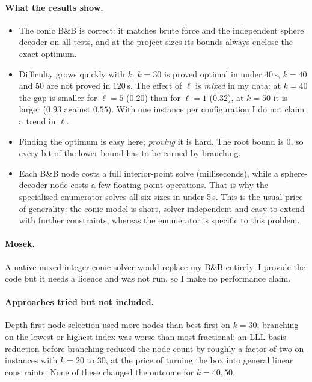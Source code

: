 \documentclass[11pt,a4paper]{article}
\newcommand{\BB}{B\&B}
\begin{document}
\paragraph{What the results show.}
\begin{itemize}
  \item The conic \BB{} is correct: it matches brute force and the independent sphere decoder on all tests, and at the project sizes its bounds always enclose the exact optimum.
  \item Difficulty grows quickly with $k$: $k=30$ is proved optimal in under 40\,s, $k=40$ and $50$ are not proved in 120\,s. The effect of $\ell$ is \emph{mixed} in my data: at $k=40$ the gap is smaller for $\ell=5$ ($0.20$) than for $\ell=1$ ($0.32$), at $k=50$ it is larger ($0.93$ against $0.55$). With one instance per configuration I do not claim a trend in $\ell$.
  \item Finding the optimum is easy here; \emph{proving} it is hard. The root bound is $0$, so every bit of the lower bound has to be earned by branching.
  \item Each \BB{} node costs a full interior-point solve (milliseconds), while a sphere-decoder node costs a few floating-point operations. That is why the specialised enumerator solves all six sizes in under 5\,s. This is the usual price of generality: the conic model is short, solver-independent and easy to extend with further constraints, whereas the enumerator is specific to this problem.
\end{itemize}

\paragraph{Mosek.} A native mixed-integer conic solver would replace my \BB{} entirely. I provide the code but it needs a licence and was not run, so I make no performance claim.

\paragraph{Approaches tried but not included.}
Depth-first node selection used more nodes than best-first on $k=30$; branching on the lowest or highest index was worse than most-fractional; an LLL basis reduction before branching reduced the node count by roughly a factor of two on instances with $k=20$ to $30$, at the price of turning the box into general linear constraints. None of these changed the outcome for $k=40,50$.
\end{document}
